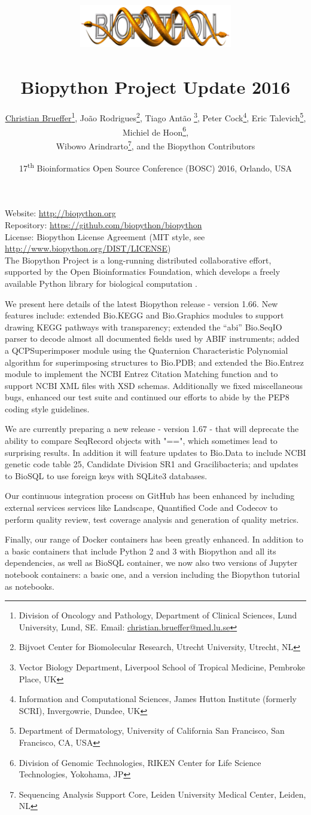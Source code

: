 \documentclass[10pt,oneside]{article}
\title{%
\vspace{-1.5in}
\includegraphics[width=0.5\textwidth]{biopython.jpg}\\
~\\Biopython Project Update 2016}
\author{
	\underline{Christian Brueffer}\footnote{Division of Oncology and Pathology, Department of Clinical Sciences, Lund University, Lund, SE. Email: \href{mailto:christian.brueffer@med.lu.se}{christian.brueffer@med.lu.se}},
    Jo\~{a}o Rodrigues\footnote{Bijvoet Center for Biomolecular Research, Utrecht University, Utrecht, NL},
    Tiago Ant\~{a}o \footnote{Vector Biology Department, Liverpool School of Tropical Medicine, Pembroke Place, UK},
    Peter Cock\footnote{Information and Computational Sciences, James Hutton Institute (formerly SCRI), Invergowrie, Dundee, UK},
    Eric Talevich\footnote{Department of Dermatology, University of California San Francisco, San Francisco, CA, USA},
    Michiel de Hoon\footnote{Division of Genomic Technologies, RIKEN Center for Life Science Technologies, Yokohama, JP},
		\\
    Wibowo Arindrarto\footnote{Sequencing Analysis Support Core, Leiden University Medical Center, Leiden, NL},
    and the Biopython Contributors}
\date{17\textsuperscript{th} Bioinformatics Open Source Conference (BOSC) 2016, Orlando, USA}
\begin{document}
\maketitle
\thispagestyle{empty}

\vspace{-0.2in}
\noindent
Website: \url{http://biopython.org} \\
Repository: \url{https://github.com/biopython/biopython} \\
License: Biopython License Agreement (MIT style, see \url{http://www.biopython.org/DIST/LICENSE}) \\

The Biopython Project is a long-running distributed collaborative effort,
supported by the Open Bioinformatics Foundation, which develops a freely
available Python library for biological computation \cite{AppNote}.

We present here details of the latest Biopython release - version 1.66. New
features include: extended Bio.KEGG and Bio.Graphics modules to support drawing
KEGG pathways with transparency; extended the ``abi'' Bio.SeqIO parser to decode
almost all documented fields used by ABIF instruments; added a QCPSuperimposer
module using the Quaternion Characteristic Polynomial algorithm for superimposing
structures to Bio.PDB; and extended the Bio.Entrez module to implement the NCBI
Entrez Citation Matching function and to support NCBI XML files with XSD schemas.
Additionally we fixed miscellaneous bugs, enhanced our test suite and continued our
efforts to abide by the PEP8 coding style guidelines.

We are currently preparing a new release - version 1.67 - that will deprecate the
ability to compare SeqRecord objects with "==", which sometimes lead to surprising
results.  In addition it will feature updates to Bio.Data to include NCBI genetic
code table 25, Candidate Division SR1 and Gracilibacteria; and updates to BioSQL to
use foreign keys with SQLite3 databases.

Our continuous integration process on GitHub has been enhanced by including
external services services like Landscape, Quantified Code and Codecov to perform
quality review, test coverage analysis and generation of quality metrics.

Finally, our range of Docker containers has been greatly enhanced. In addition to
a basic containers that include Python 2 and 3 with Biopython and all its
dependencies, as well as BioSQL container, we now also two versions of Jupyter
notebook containers: a basic one, and a version including the Biopython tutorial as
notebooks.
\end{document}
